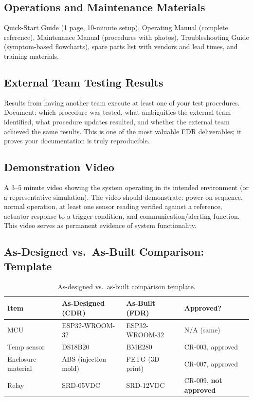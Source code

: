 \documentclass[11pt,letterpaper,twoside,openany]{book}
\begin{document}
\subsection{Operations and Maintenance Materials}
Quick-Start Guide (1 page, 10-minute setup), Operating Manual (complete reference), Maintenance Manual (procedures with photos), Troubleshooting Guide (symptom-based flowcharts), spare parts list with vendors and lead times, and training materials.


\subsection{External Team Testing Results}
Results from having another team execute at least one of your test procedures. Document: which procedure was tested, what ambiguities the external team identified, what procedure updates resulted, and whether the external team achieved the same results. This is one of the most valuable FDR deliverables; it proves your documentation is truly reproducible.

\subsection{Demonstration Video}
A 3--5 minute video showing the system operating in its intended environment (or a representative simulation). The video should demonstrate: power-on sequence, normal operation, at least one sensor reading verified against a reference, actuator response to a trigger condition, and communication/alerting function. This video serves as permanent evidence of system functionality.


\subsection{As-Designed vs.\ As-Built Comparison: Template}
\begin{table}[htbp]\centering\small
\begin{tabularx}{\textwidth}{l X X l}
\toprule
\textbf{Item} & \textbf{As-Designed (CDR)} & \textbf{As-Built (FDR)} & \textbf{Approved?} \\
\midrule
MCU & ESP32-WROOM-32 & ESP32-WROOM-32 & N/A (same) \\
Temp sensor & DS18B20 & BME280 & CR-003, approved \\
Enclosure material & ABS (injection mold) & PETG (3D print) & CR-007, approved \\
Relay & SRD-05VDC & SRD-12VDC & CR-009, \textbf{not approved} \\
\bottomrule
\end{tabularx}
\caption{As-designed vs.\ as-built comparison template.}
\end{table}
\end{document}
